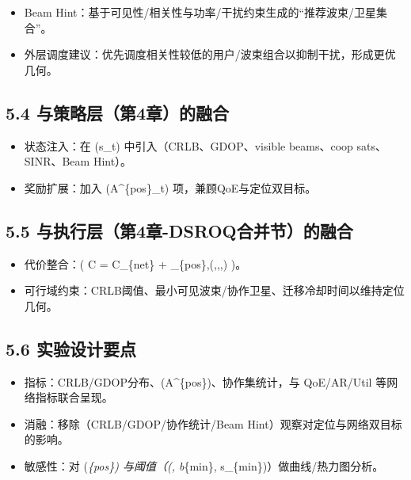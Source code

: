 \begin{itemize}
\tightlist
\item
  Beam
  Hint：基于可见性/相关性与功率/干扰约束生成的``推荐波束/卫星集合''。
\item
  外层调度建议：优先调度相关性较低的用户/波束组合以抑制干扰，形成更优几何。
\end{itemize}

\subsection{5.4
与策略层（第4章）的融合}\label{ux4e0eux7b56ux7565ux5c42ux7b2c4ux7ae0ux7684ux878dux5408}

\begin{itemize}
\tightlist
\item
  状态注入：在 (s\_t) 中引入（CRLB、GDOP、visible beams、coop
  sats、SINR、Beam Hint）。
\item
  奖励扩展：加入 (A\^{}\{pos\}\_t) 项，兼顾QoE与定位双目标。
\end{itemize}

\subsection{5.5
与执行层（第4章-DSROQ合并节）的融合}\label{ux4e0eux6267ux884cux5c42ux7b2c4ux7ae0-dsroqux5408ux5e76ux8282ux7684ux878dux5408}

\begin{itemize}
\tightlist
\item
  代价整合：( C = C\_\{net\} +
  \lambda\_\{pos\},\Phi(,,,)
  )。
\item
  可行域约束：CRLB阈值、最小可见波束/协作卫星、迁移冷却时间以维持定位几何。
\end{itemize}

\subsection{5.6
实验设计要点}\label{ux5b9eux9a8cux8bbeux8ba1ux8981ux70b9}

\begin{itemize}
\tightlist
\item
  指标：CRLB/GDOP分布、(A\^{}\{pos\})、协作集统计，与 QoE/AR/Util
  等网络指标联合呈现。
\item
  消融：移除（CRLB/GDOP/协作统计/Beam
  Hint）观察对定位与网络双目标的影响。
\item
  敏感性：对 (\lambda\emph{\{pos\}) 与阈值（(\tau, b}\{min\},
  s\_\{min\})）做曲线/热力图分析。
\end{itemize}

